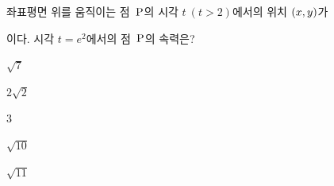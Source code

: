 좌표평면 위를 움직이는 점~$\mathrm{P}$의 시각 $t\ (t>2)$에서의 위치 $(x{,}\mkern3mu\mathopen{}y)$가 \par\smallskip{}\par\smallskip\noindent 이다. 시각 $t=e^2$에서의 점~$\mathrm{P}$의 속력은?
\begin{choices32}{\rule[-3ex]{0pt}{8ex}$\sqrt{7}$}{\rule[-3ex]{0pt}{8ex}$2\sqrt{2}$}{\rule[-3ex]{0pt}{8ex}$3$}{\rule[-3ex]{0pt}{8ex}$\sqrt{10}$}{\rule[-3ex]{0pt}{8ex}$\sqrt{11}$}\end{choices32}
